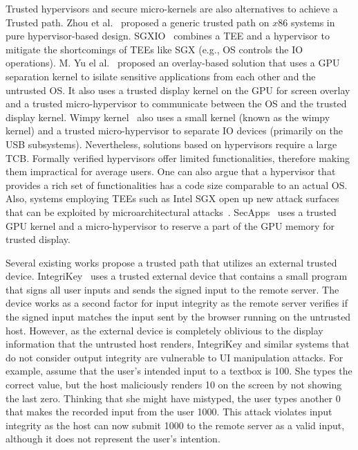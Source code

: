  Trusted hypervisors and secure micro-kernels are also alternatives to achieve a Trusted path. Zhou et al.~\cite{zhou2012building} proposed a generic trusted path on $x86$ systems in pure hypervisor-based design. SGXIO~\cite{weiser2017sgxio} combines a TEE and a hypervisor to mitigate the shortcomings of TEEs like SGX (e.g., OS controls the IO operations). M. Yu el al.~\cite{10.1145/2810103.2813719} proposed an overlay-based solution that uses a GPU separation kernel to isilate sensitive applications from each other and the untrusted OS. It also uses a trusted display kernel on the GPU for screen overlay and a trusted micro-hypervisor to communicate between the OS and the trusted display kernel. Wimpy kernel~\cite{wimpyKernel} also uses a small kernel (known as the wimpy kernel) and a trusted micro-hypervisor to separate IO devices (primarily on the USB subsystems). Nevertheless, solutions based on hypervisors require a large TCB. Formally verified hypervisors offer limited functionalities, therefore making them impractical for average users. One can also argue that a hypervisor that provides a rich set of functionalities has a code size comparable to an actual OS. Also, systems employing TEEs such as Intel SGX open up new attack surfaces that can be exploited by microarchitectural attacks~\cite{van2018foreshadow}. SecApps~\cite{yu2015trusted} uses a trusted GPU kernel and a micro-hypervisor to reserve a part of the GPU memory for trusted display. 


 Several existing works propose a trusted path that utilizes an external trusted device. IntegriKey~\cite{integrikey} uses a trusted external device that contains a small program that signs all user inputs and sends the signed input to the remote server. The device works as a second factor for input integrity as the remote server verifies if the signed input matches the input sent by the browser running on the untrusted host. However, as the external device is completely oblivious to the display information that the untrusted host renders, IntegriKey and similar systems that do not consider output integrity are vulnerable to UI manipulation attacks. For example, assume that the user's intended input to a textbox is 100. She types the correct value, but the host maliciously renders 10 on the screen by not showing the last zero. Thinking that she might have mistyped, the user types another 0 that makes the recorded input from the user 1000. This attack violates input integrity as the host can now submit 1000 to the remote server as a valid input, although it does not represent the user's intention. 



